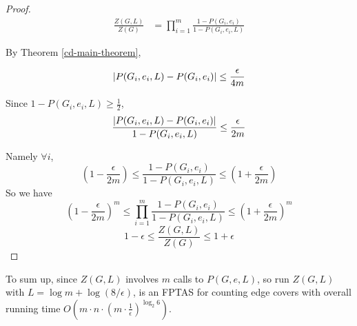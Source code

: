 \begin{proof}

	\begin{align*}
		\frac{Z(G, L)}{Z(G)} &= \prod_{i=1}^m \frac{1-P(G_i, e_i)}{1-P(G_i, e_i, L)}
	\end{align*}

	By Theorem \ref{cd-main-theorem},

	\[\left\vert P(G_i, e_i, L) - P(G_i,e_i)\right\vert \leq \frac{\epsilon}{4m}\]

	Since $1-P(G_i,e_i, L) \geq \frac{1}{2}$,
	\[ \frac{\left\vert P(G_i, e_i, L) - P(G_i,e_i)\right\vert}{1 - P(G_i,e_i, L)} \leq \frac{\epsilon}{2m}\]
	
	Namely $\forall i$,
	\[ \left( 1 - \frac{\epsilon}{2m} \right) \leq \frac{1-P(G_i, e_i)}{1 - P(G_i,e_i, L)} \leq \left( 1 + \frac{\epsilon}{2m} \right)\]
	So we have
	\[ \left( 1 - \frac{\epsilon}{2m} \right)^m \leq \prod_{i=1}^m \frac{1-P(G_i, e_i)}{1 - P(G_i,e_i, L)} \leq \left( 1 + \frac{\epsilon}{2m} \right)^m\]
	\[ 1- \epsilon \leq \frac{Z(G, L)}{Z(G)} \leq 1+ \epsilon\]


\end{proof}

To sum up, since $Z(G, L)$ involves $m$ calls to $P(G,e,L)$, so run $Z(G, L)$ with $L = \log m + \log(8/ \epsilon)$, is an FPTAS for counting edge covers with overall running time $O(m \cdot n \cdot ( m\cdot \frac{1}{\epsilon})^ {\log_2 6} )$.
